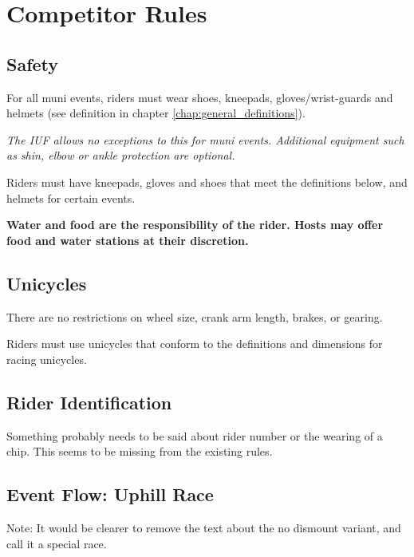 \chapter{Competitor Rules}

\section{Safety}
For all muni events, riders must wear shoes, kneepads, gloves/wrist-guards and helmets (see definition in chapter \ref{chap:general_definitions}).

\textit{The IUF allows no exceptions to this for muni events. Additional equipment such as shin, elbow or ankle protection are optional.}

Riders must have kneepads, gloves and shoes that meet the definitions below, and helmets for certain events.

\textbf{Water and food are the responsibility of the rider. Hosts may offer food and water stations at their discretion.}

\section{Unicycles}

There are no restrictions on wheel size, crank arm length, brakes, or gearing.

Riders must use unicycles that conform to the definitions and dimensions for racing unicycles.

\section{Rider Identification}

\begin{framed}
Something probably needs to be said about rider number or the wearing of a chip.  This seems to be missing from the existing rules.
\end{framed}

\section{Event Flow: Uphill Race \label{sec:muni_uphill}}

\begin{framed}
Note: It would be clearer to remove the text about the no dismount variant, and call it a special race.
\end{framed}

